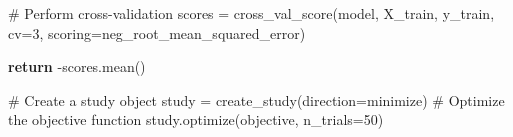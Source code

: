 \documentclass[
  letterpaper,
  DIV=11,
  numbers=noendperiod]{scrreprt}
\newenvironment{Shaded}{\begin{snugshade}}{\end{snugshade}}
\newcommand{\CommentTok}[1]{\textcolor[rgb]{0.37,0.37,0.37}{#1}}
\newcommand{\ControlFlowTok}[1]{\textcolor[rgb]{0.00,0.23,0.31}{\textbf{#1}}}
\newcommand{\DecValTok}[1]{\textcolor[rgb]{0.68,0.00,0.00}{#1}}
\newcommand{\NormalTok}[1]{\textcolor[rgb]{0.00,0.23,0.31}{#1}}
\newcommand{\OperatorTok}[1]{\textcolor[rgb]{0.37,0.37,0.37}{#1}}
\newcommand{\StringTok}[1]{\textcolor[rgb]{0.13,0.47,0.30}{#1}}
\begin{document}
\begin{Shaded}
\begin{Highlighting}[]
    \CommentTok{\# Perform cross{-}validation}
\NormalTok{    scores }\OperatorTok{=}\NormalTok{ cross\_val\_score(model, X\_train, y\_train, cv}\OperatorTok{=}\DecValTok{3}\NormalTok{, scoring}\OperatorTok{=}\StringTok{\textquotesingle{}neg\_root\_mean\_squared\_error\textquotesingle{}}\NormalTok{)}
    
    \ControlFlowTok{return} \OperatorTok{{-}}\NormalTok{scores.mean()}

\CommentTok{\# Create a study object}
\NormalTok{study }\OperatorTok{=}\NormalTok{ create\_study(direction}\OperatorTok{=}\StringTok{\textquotesingle{}minimize\textquotesingle{}}\NormalTok{)}
\CommentTok{\# Optimize the objective function}
\NormalTok{study.optimize(objective, n\_trials}\OperatorTok{=}\DecValTok{50}\NormalTok{)}
\end{Highlighting}
\end{Shaded}
\end{document}
